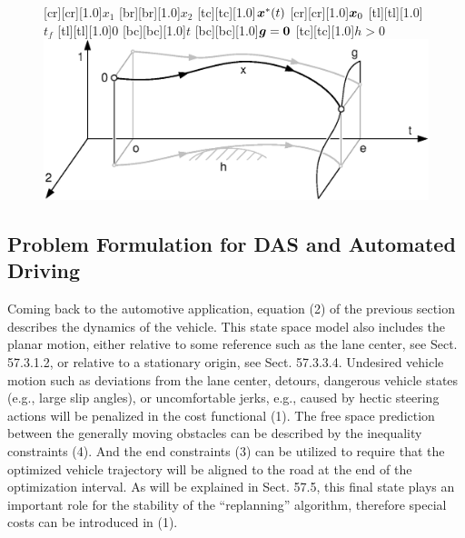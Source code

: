 \begin{figure}[h]
[cr][cr][1.0]{$x_1$}
[br][br][1.0]{$x_2$}
[tc][tc][1.0]{$\boldsymbol{x}^\ast(t)$}
[cr][cr][1.0]{$\boldsymbol{x}_0$}
[tl][tl][1.0]{$t_f$}
[tl][tl][1.0]{$0$}
[bc][bc][1.0]{$t$}
[bc][bc][1.0]{$\boldsymbol{g}=\boldsymbol{0}$}
[tc][tc][1.0]{$h>0$}
	\centering
  	\includegraphics[width=1.\textwidth,clip, trim = 0cm 0cm 0cm 0cm]{pics/2_Darstellung_dynamische_Optimierung_endvorgabe.eps}
    \label{fig:dynamische_Optimierung_endvorgabe}
\end{figure}

\subsection{Problem Formulation for DAS and Automated Driving}
Coming back to the automotive application, equation (2) of the previous section describes the dynamics of the vehicle. This state space model also includes the planar motion, either relative to some reference such as the lane center, see Sect. 57.3.1.2, or relative to a stationary origin, see Sect. 57.3.3.4. Undesired vehicle motion such as deviations from the lane center, detours, dangerous vehicle states (e.g., large slip angles), or uncomfortable jerks, e.g., caused by hectic steering actions will be penalized in the cost functional (1). The free space prediction between the generally moving obstacles can be described by the inequality constraints (4). And the end constraints (3) can be utilized to require that the optimized vehicle trajectory will be aligned to the road at the end of the optimization interval. As will be explained in Sect. 57.5, this final state plays an important role for the stability of the “replanning” algorithm, therefore special costs
can be introduced in (1). 

